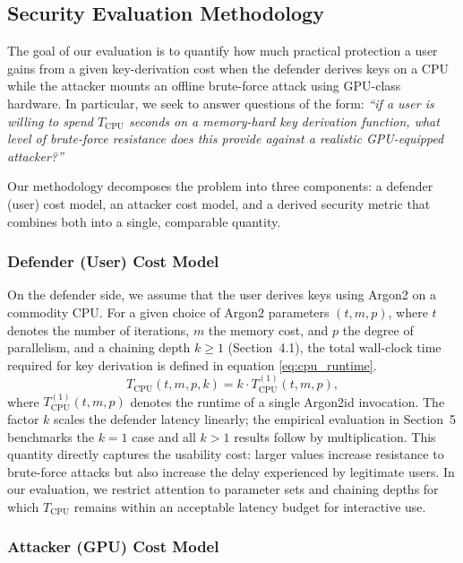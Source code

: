 \documentclass[journal,article,accept,pdftex,moreauthors]{Definitions/mdpi}
\begin{document}
\subsection{Security Evaluation Methodology}
\label{sec:security_evaluation}

The goal of our evaluation is to quantify how much practical protection a user gains from a given key-derivation cost when the defender derives keys on a CPU while the attacker mounts an offline brute-force attack using GPU-class hardware. In particular, we seek to answer questions of the form: \emph{``if a user is willing to spend $T_{\text{CPU}}$ seconds on a memory-hard key derivation function, what level of brute-force resistance does this provide against a realistic GPU-equipped attacker?''}

Our methodology decomposes the problem into three components: a defender (user) cost model, an attacker cost model, and a derived security metric that combines both into a single, comparable quantity.

\subsubsection{Defender (User) Cost Model}

On the defender side, we assume that the user derives keys using Argon2 on a commodity CPU. For a given choice of Argon2 parameters $(t, m, p)$, where $t$ denotes the number of iterations, $m$ the memory cost, and $p$ the degree of parallelism, and a chaining depth $k \geq 1$ (Section~4.1), the total wall-clock time required for key derivation is defined in equation \ref{eq:cpu_runtime}.
\begin{equation}
T_{\text{CPU}}(t, m, p, k) = k \cdot T_{\text{CPU}}^{(1)}(t, m, p),
\label{eq:cpu_runtime}
\end{equation}
where $T_{\text{CPU}}^{(1)}(t, m, p)$ denotes the runtime of a single Argon2id invocation. The factor $k$ scales the defender latency linearly; the empirical evaluation in Section~5 benchmarks the $k=1$ case and all $k > 1$ results follow by multiplication. This quantity directly captures the usability cost: larger values increase resistance to brute-force attacks but also increase the delay experienced by legitimate users. In our evaluation, we restrict attention to parameter sets and chaining depths for which $T_{\text{CPU}}$ remains within an acceptable latency budget for interactive use.

\subsubsection{Attacker (GPU) Cost Model}
\end{document}
